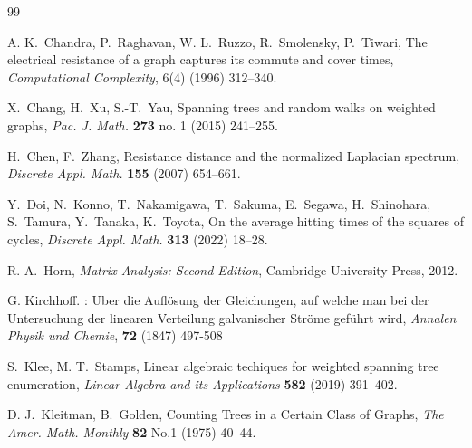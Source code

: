 \documentclass[12pt, leqno]{amsart}
\numberwithin{equation}{section}
\theoremstyle{plain}
\theoremstyle{definition}
\newcommand{\0}{\mathbf{0}}
\begin{document}
\begin{thebibliography}{99}
 


A. K.~Chandra, P.~Raghavan, W. L.~Ruzzo, R.~Smolensky, P.~Tiwari,
The electrical resistance of a graph captures its commute and cover times,
{\sl Computational Complexity},
6(4) (1996) 312--340.

X.~Chang, H.~Xu, S.-T.~Yau,
Spanning trees and random walks on weighted graphs,
{\sl Pac. J. Math.} {\bf 273} no. 1 (2015) 241--255.

H.~Chen, F.~Zhang,
Resistance distance and the normalized Laplacian spectrum,
{\sl Discrete Appl. Math.} {\bf 155} (2007) 654--661.

Y.~Doi, N.~Konno, T.~Nakamigawa, T.~Sakuma, E.~Segawa, H.~Shinohara, S.~Tamura, Y.~Tanaka, K.~Toyota,
On the average hitting times of the squares of cycles,
{\sl Discrete Appl. Math.} {\bf 313} (2022) 18--28.

R. A.~Horn,
{\sl Matrix Analysis: Second Edition},
Cambridge University Press, 2012.


  G. Kirchhoff. : Uber die Aufl\"{o}sung der Gleichungen, auf welche man bei der Untersuchung der linearen Verteilung galvanischer Str\"{o}me gef\"{u}hrt wird, \textit{Annalen Physik und Chemie}, \textbf{72} (1847) 497-508

S.~Klee, M. T.~Stamps,
Linear algebraic techiques for weighted spanning tree enumeration,
{\sl Linear Algebra and its Applications}
{\bf 582} (2019) 391--402.

D. J.~Kleitman, B.~Golden,
Counting Trees in a Certain Class of Graphs,
{\sl The Amer. Math. Monthly} 
{\bf 82} No.1 (1975) 40--44.


\end{thebibliography}
\end{document}
